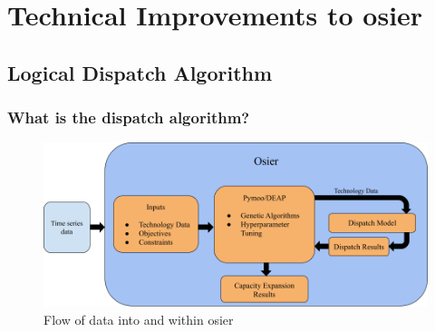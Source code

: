 \section{Technical Improvements to \gls{osier}}

\subsection{Logical Dispatch Algorithm}

\begin{frame}
    \frametitle{What is the dispatch algorithm?}

    \begin{figure}
        \centering
        \includegraphics[width=\columnwidth]{../docs/figures/03_osier_chapter/osier_flow.png}
        \caption{Flow of data into and within \gls{osier}}
        \label{fig:osier-flow}
    \end{figure}

\end{frame}

